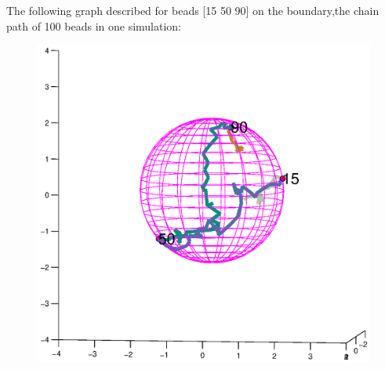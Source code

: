 \documentclass{article}
\begin{document}
The following graph described for beads [15 50 90] on the boundary,the chain path of 100 beads in one simulation:\\
\begin{figure}[H]
\centering
\includegraphics[width=7.2in]{bOnB.eps}	
\end{figure}
\end{document}
